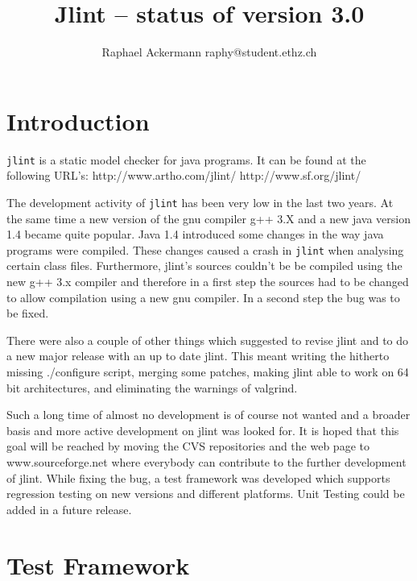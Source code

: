 \documentclass[11pt,twoside,a4paper,draft]{article}
\author{Raphael Ackermann raphy@student.ethz.ch}
\title{Jlint -- status of version 3.0}
\begin{document}
\maketitle

\newpage

\tableofcontents

\newpage

\section {Introduction}

\texttt{jlint} is a static model checker for java programs. \newline
It can be found at the following URL's: 
http://www.artho.com/jlint/ \newline
http://www.sf.org/jlint/ \newline

The development activity of \texttt{jlint} has been very low in the last two
years. At the same time a new version of the gnu compiler g++ 3.X and a new
java version 1.4 became quite popular. Java 1.4 introduced some changes in the
way java programs were compiled. These changes caused a crash in \texttt{jlint}
when analysing certain class files. Furthermore, jlint's sources couldn't be
be compiled using the new g++ 3.x compiler and therefore in a first step the
sources had to be changed to allow compilation using a new gnu compiler. In a
second step the bug was to be fixed.

There were also a couple of other things which suggested to revise jlint and
to do a new major release with an up to date jlint. This meant writing
the hitherto missing ./configure script, merging some patches, making 
jlint able to work on 64 bit architectures, and eliminating the warnings
of valgrind.

Such a long time of almost no development is of course not wanted and
a broader basis and more active development on jlint was looked for.
It is hoped that this goal will be reached by moving the CVS repositories 
and the web page to www.sourceforge.net where everybody can contribute 
to the further development of jlint.
While fixing the bug, a test framework was developed which supports
regression testing on new versions and different platforms.
Unit Testing could be added in a future release.

\section {Test Framework}
\end{document}
